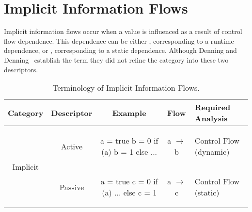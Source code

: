 \section{Implicit Information Flows}
\label{sec:implicit-flow}

Implicit information flows occur when a value is influenced as a result of control flow dependence.
This dependence can be either , corresponding to a runtime dependence, or , corresponding to a static dependence.
Although Denning and Denning~\cite{denning.denning+77} establish the term  they did not refine the category into these two descriptors.

\begin{table*}[h]
\centering
\begin{tabular}{ccccm{2.5cm}}
\toprule
Category & Descriptor & Example & Flow & Required Analysis \\
\midrule[\heavyrulewidth]
\multirow{7}{*}{Implicit} & Active &
\begin{js-embed}
a = true
b = 0
if (a)
   b = 1
else
   ...
\end{js-embed}
& a $\rightarrow$ b & Control Flow (dynamic)\\
\cmidrule(r){2-5} & Passive &
\begin{js-embed}
a = true
c = 0
if (a)
   ...
else
   c = 1
\end{js-embed}
& a $\rightarrow$ c & Control Flow (static)\\
\bottomrule
\end{tabular}
\caption{Terminology of Implicit Information Flows.}
\label{table:implicitterminology}
\end{table*}


